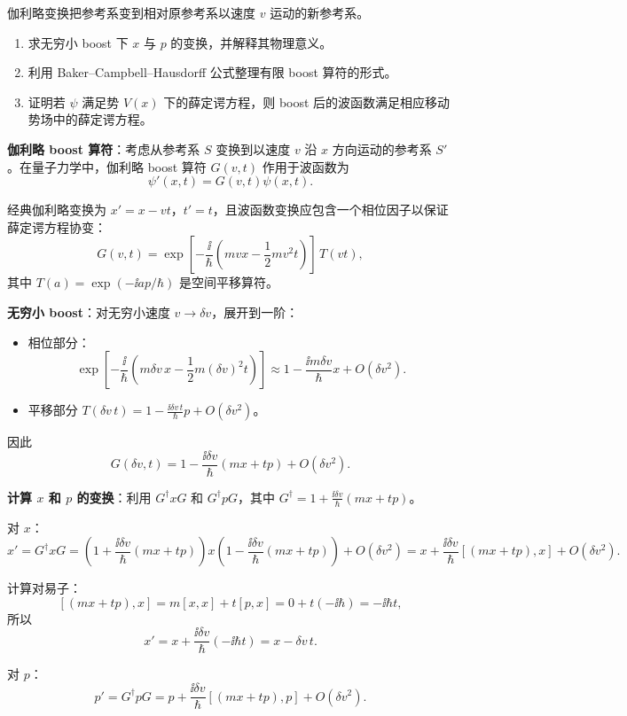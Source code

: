 \begin{question}
伽利略变换把参考系变到相对原参考系以速度 $v$ 运动的新参考系。
\begin{enumerate}
\item 求无穷小 boost 下 $x$ 与 $p$ 的变换，并解释其物理意义。
\item 利用 Baker--Campbell--Hausdorff 公式整理有限 boost 算符的形式。
\item 证明若 $\psi$ 满足势 $V(x)$ 下的薛定谔方程，则 boost 后的波函数满足相应移动势场中的薛定谔方程。
\end{enumerate}
\end{question}
\begin{solution}
	\textbf{伽利略 boost 算符}：考虑从参考系 $S$ 变换到以速度 $v$ 沿 $x$ 方向运动的参考系 $S'$。在量子力学中，伽利略 boost 算符 $G(v,t)$ 作用于波函数为
	\[
	\psi'(x,t) = G(v,t)\psi(x,t).
	\]

	经典伽利略变换为 $x'=x-vt$，$t'=t$，且波函数变换应包含一个相位因子以保证薛定谔方程协变：
	\[
	G(v,t) = \exp\!\left[-\frac{\ii}{\hbar}\left(mvx - \frac12 mv^2 t\right)\right]\,T(vt),
	\]
	其中 $T(a)=\exp(-\ii a p/\hbar)$ 是空间平移算符。

	\textbf{无穷小 boost}：对无穷小速度 $v\to\delta v$，展开到一阶：
	\begin{itemize}
	\item 相位部分：
	\[
	\exp\!\left[-\frac{\ii}{\hbar}\left(m\delta v\,x - \frac12 m(\delta v)^2 t\right)\right]
	\approx 1 - \frac{\ii m\delta v}{\hbar}x + O(\delta v^2).
	\]
	\item 平移部分 $T(\delta v\,t) = 1 - \frac{\ii\delta v\,t}{\hbar}p + O(\delta v^2)$。
	\end{itemize}

	因此
	\[
	G(\delta v,t) = 1 - \frac{\ii\delta v}{\hbar}(mx + tp) + O(\delta v^2).
	\]

	\textbf{计算 $x$ 和 $p$ 的变换}：利用 $G^\dagger x G$ 和 $G^\dagger p G$，其中 $G^\dagger = 1 + \frac{\ii\delta v}{\hbar}(mx+tp)$。

	对 $x$：
	\[
	x' = G^\dagger x G
	= \left(1+\frac{\ii\delta v}{\hbar}(mx+tp)\right) x \left(1-\frac{\ii\delta v}{\hbar}(mx+tp)\right) + O(\delta v^2)
	= x + \frac{\ii\delta v}{\hbar}[(mx+tp),x] + O(\delta v^2).
	\]

	计算对易子：
	\[
	[(mx+tp),x] = m[x,x] + t[p,x] = 0 + t(-\ii\hbar) = -\ii\hbar t,
	\]
	所以
	\[
	x' = x + \frac{\ii\delta v}{\hbar}(-\ii\hbar t) = x - \delta v\,t.
	\]

	对 $p$：
	\[
	p' = G^\dagger p G = p + \frac{\ii\delta v}{\hbar}[(mx+tp),p] + O(\delta v^2).
	\]


\end{solution}
